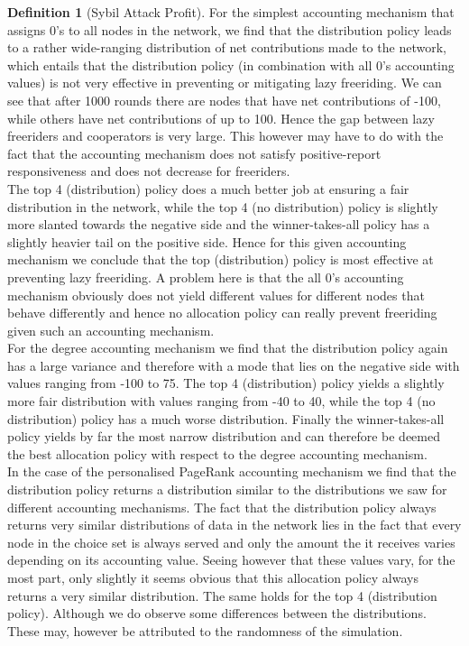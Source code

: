\documentclass[11pt,a4paper]{report}
\theoremstyle{definition}
\newtheorem{definition}{Definition}[section]
\theoremstyle{theorem}
\theoremstyle{proposition}
\theoremstyle{corollary}
\theoremstyle{lemma}
\theoremstyle{example}
\theoremstyle{remark}
\begin{document}
\begin{definition}[Sybil Attack Profit]
\noindent{}For the simplest accounting mechanism that assigns $0$'s to all nodes in the network, we find that the distribution policy leads to a rather wide-ranging distribution of net contributions made to the network, which entails that the distribution policy (in combination with all $0$'s accounting values) is not very effective in preventing or mitigating lazy freeriding. We can see that after 1000 rounds there are nodes that have net contributions of -100, while others have net contributions of up to 100. Hence the gap between lazy freeriders and cooperators is very large. This however may have to do with the fact that the accounting mechanism does not satisfy positive-report responsiveness and does not decrease for freeriders. \vspace{1em}\\

\noindent{}The top 4 (distribution) policy does a much better job at ensuring a fair distribution in the network, while the top 4 (no distribution) policy is slightly more slanted towards the negative side and the winner-takes-all policy has a slightly heavier tail on the positive side. Hence for this given accounting mechanism we conclude that the top (distribution) policy is most effective at preventing lazy freeriding. A problem here is that the all $0$'s accounting mechanism obviously does not yield different values for different nodes that behave differently and hence no allocation policy can really prevent freeriding given such an accounting mechanism. \vspace{1em}\\

\noindent{}For the degree accounting mechanism we find that the distribution policy again has a large variance and therefore with a mode that lies on the negative side with values ranging from -100 to 75. The top 4 (distribution) policy yields a slightly more fair distribution with values ranging from -40 to 40, while the top 4 (no distribution) policy has a much worse distribution. Finally the winner-takes-all policy yields by far the most narrow distribution and can therefore be deemed the best allocation policy with respect to the degree accounting mechanism.\vspace{1em}\\

\noindent{}In the case of the personalised PageRank accounting mechanism we find that the distribution policy returns a distribution similar to the distributions we saw for different accounting mechanisms. The fact that the distribution policy always returns very similar distributions of data in the network lies in the fact that every node in the choice set is always served and only the amount the it receives varies depending on its accounting value. Seeing however that these values vary, for the most part, only slightly it seems obvious that this allocation policy always returns a very similar distribution. The same holds for the top 4 (distribution policy). Although we do observe some differences between the distributions. These may, however be attributed to the randomness of the simulation.\vspace{1em}\\


\end{definition}
\end{document}
